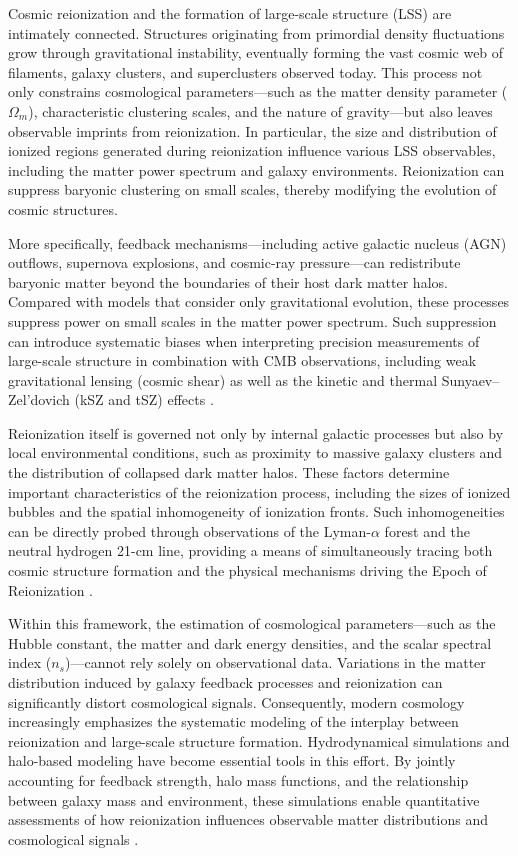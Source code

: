 Cosmic reionization and the formation of large-scale structure (LSS) are intimately connected. Structures originating from primordial density fluctuations grow through gravitational instability, eventually forming the vast cosmic web of filaments, galaxy clusters, and superclusters observed today. This process not only constrains cosmological parameters---such as the matter density parameter ($\Omega_m$), characteristic clustering scales, and the nature of gravity---but also leaves observable imprints from reionization. In particular, the size and distribution of ionized regions generated during reionization influence various LSS observables, including the matter power spectrum and galaxy environments. Reionization can suppress baryonic clustering on small scales, thereby modifying the evolution of cosmic structures.

More specifically, feedback mechanisms---including active galactic nucleus (AGN) outflows, supernova explosions, and cosmic-ray pressure---can redistribute baryonic matter beyond the boundaries of their host dark matter halos. Compared with models that consider only gravitational evolution, these processes suppress power on small scales in the matter power spectrum. Such suppression can introduce systematic biases when interpreting precision measurements of large-scale structure in combination with CMB observations, including weak gravitational lensing (cosmic shear) as well as the kinetic and thermal Sunyaev--Zel'dovich (kSZ and tSZ) effects \cite{siegel2025}.

Reionization itself is governed not only by internal galactic processes but also by local environmental conditions, such as proximity to massive galaxy clusters and the distribution of collapsed dark matter halos. These factors determine important characteristics of the reionization process, including the sizes of ionized bubbles and the spatial inhomogeneity of ionization fronts. Such inhomogeneities can be directly probed through observations of the Lyman-$\alpha$ forest and the neutral hydrogen 21-cm line, providing a means of simultaneously tracing both cosmic structure formation and the physical mechanisms driving the Epoch of Reionization \cite{smith2022}.

Within this framework, the estimation of cosmological parameters---such as the Hubble constant, the matter and dark energy densities, and the scalar spectral index ($n_s$)---cannot rely solely on observational data. Variations in the matter distribution induced by galaxy feedback processes and reionization can significantly distort cosmological signals. Consequently, modern cosmology increasingly emphasizes the systematic modeling of the interplay between reionization and large-scale structure formation. Hydrodynamical simulations and halo-based modeling have become essential tools in this effort. By jointly accounting for feedback strength, halo mass functions, and the relationship between galaxy mass and environment, these simulations enable quantitative assessments of how reionization influences observable matter distributions and cosmological signals \cite{smith2022}.

